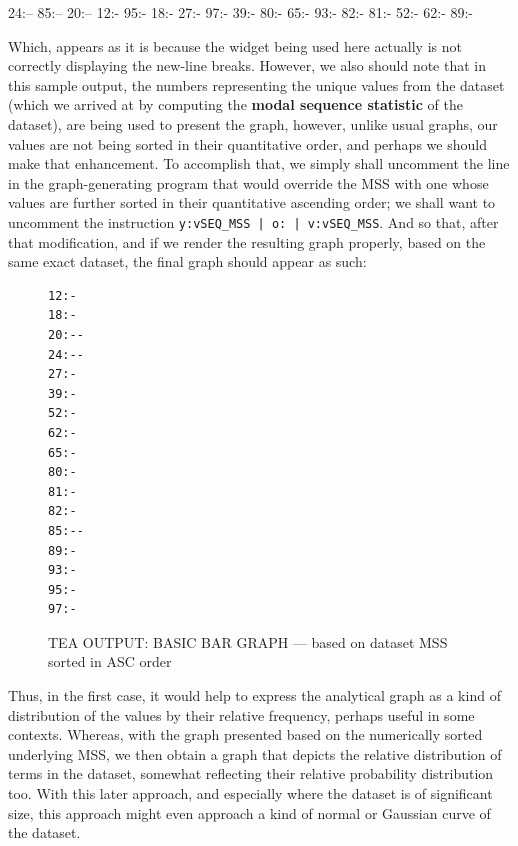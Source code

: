 \documentclass[a4paper, 18pt]{book} %
\begin{document}
  \begin{tcolorbox}[title=Sample OUTPUT Bar-GRAPH from Dataset of 20 Random Numbers (Ages),  breakable,listing options={basicstyle=\ttfamily, breaklines=true, breakatwhitespace=true}]
24:--
85:--
20:--
12:-
95:-
18:-
27:-
97:-
39:-
80:-
65:-
93:-
82:-
81:-
52:-
62:-
89:-
  \end{tcolorbox}


Which, appears as it is because the widget being used here actually is not correctly displaying the new-line breaks. However, we also should note that in this sample output, the numbers representing the unique values from the dataset (which we arrived at by computing the \textbf{modal sequence statistic} of the dataset), are being used to present the graph, however, unlike usual graphs, our values are not being sorted in their quantitative order, and perhaps we should make that enhancement. To accomplish that, we simply shall uncomment the line in the graph-generating program that would override the MSS with one whose values are further sorted in their quantitative ascending order; we shall want to uncomment the instruction \texttt{y:vSEQ\_MSS | o: | v:vSEQ\_MSS}. And so that, after that modification, and if we render the resulting graph properly, based on the same exact dataset, the final graph should appear as such:


\begin{figure}[H]
\LARGE
  \centering
  \begin{tcolorbox}[myterminalstyle, title=SORTED BAR GRAPH]
  \begin{lstlisting}
12:-
18:-
20:--
24:--
27:-
39:-
52:-
62:-
65:-
80:-
81:-
82:-
85:--
89:-
93:-
95:-
97:-                   
  \end{lstlisting}
  \end{tcolorbox}
  \caption{TEA OUTPUT: BASIC BAR GRAPH --- based on dataset MSS sorted in ASC order}
\end{figure}



\vspace{2em}

Thus, in the first case, it would help to express the analytical graph as a kind of distribution of the values by their relative frequency, perhaps useful in some contexts. Whereas, with the graph presented based on the numerically sorted underlying MSS, we then obtain a graph that depicts the relative distribution of terms in the dataset, somewhat reflecting their relative probability distribution too. With this later approach, and especially where the dataset is of significant size, this approach might even approach a kind of normal or Gaussian curve of the dataset.
\end{document}
